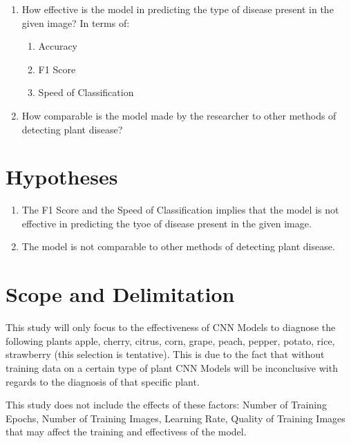    \begin{enumerate}
    \item How effective is the model in predicting the
    type of disease present in the given image? 
    In terms of:

        \begin{enumerate}
            \item Accuracy
            \item F1 Score 
            \item Speed of Classification 
        \end{enumerate}

    \item How comparable is the model made by the researcher 
    to other methods of detecting plant disease? 
    \end{enumerate}

\section{Hypotheses}
    \begin{enumerate}
        \item The F1 Score and the Speed of Classification implies that
              the model is not effective in predicting the tyoe of disease 
              present in the given image.
        \item The model is not comparable to other methods of detecting plant
              disease.
    \end{enumerate}

\section{Scope and Delimitation}
This study will only focus to the effectiveness of 
CNN Models to diagnose the following plants 
apple, cherry, citrus, corn, grape, peach, pepper,
potato, rice, strawberry (this selection is tentative). 
This is due to the fact that without training data on a 
certain type of plant CNN Models will be inconclusive with 
regards to the diagnosis of that specific plant. 

\bigskip

This study does not include the effects of these factors: Number of Training Epochs, 
Number of Training Images, Learning Rate, Quality of Training Images 
that may affect the training and effectivess of the model. 

